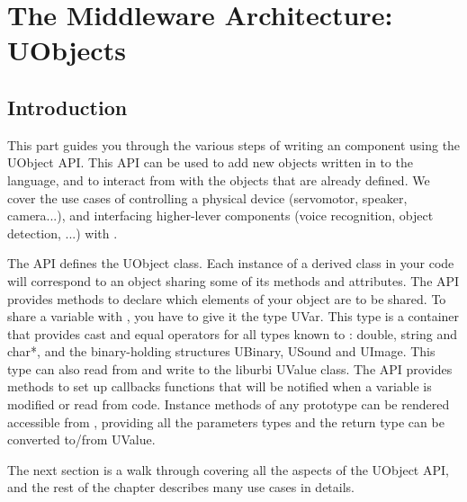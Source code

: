 \part[The Middleware Architecture: UObjects]
     {The Middleware Architecture:\\UObjects}
\label{part:uobject}

\chapter*{Introduction}
This part guides you through the various steps of writing an \urbi
\Cxx component using the UObject API. This API can be used to add new
objects written in \Cxx to the \urbi language, and to interact from
\Cxx with the objects that are already defined. We cover the use cases
of controlling a physical device (servomotor, speaker, camera...), and
interfacing higher-lever components (voice recognition, object
detection, ...) with \urbi.

The API defines the UObject class. Each instance of a derived class in
your \Cxx code will correspond to an \urbi object sharing some of its
methods and attributes. The API provides methods to declare which
elements of your object are to be shared. To share a variable with
\urbi, you have to give it the type UVar. This type is a container that
provides cast and equal operators for all types known to \urbi: double,
string and char*, and the binary-holding structures UBinary, USound
and UImage. This type can also read from and write to the liburbi
UValue class. The API provides methods to set up callbacks functions
that will be notified when a variable is modified or read from \urbi
code. Instance methods of any prototype can be rendered accessible
from \urbi, providing all the parameters types and the return type can
be converted to/from UValue.

The next section is a walk through covering all the aspects of the
UObject API, and the rest of the chapter describes many use cases in
details.






